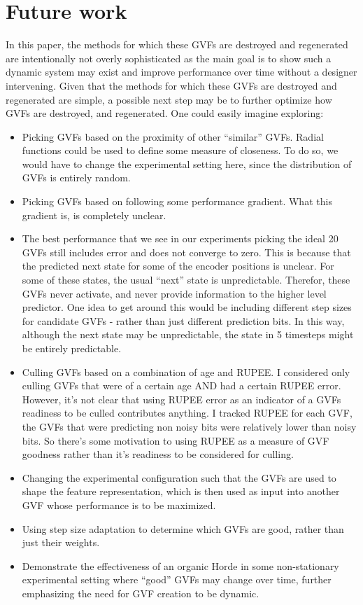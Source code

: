 \documentclass[letterpaper]{article}
\begin{document}
\section{Future work}
In this paper, the methods for which these GVFs are destroyed and regenerated are intentionally not overly sophisticated as the main goal is to show such a dynamic system may exist and improve performance over time without a designer intervening. Given that the methods for which these GVFs are destroyed and regenerated are simple, a possible next step may be to further optimize how GVFs are destroyed, and regenerated. One could easily imagine exploring:
\begin{itemize}
  \item Picking GVFs based on the proximity of other ``similar'' GVFs. Radial functions could be used to define some measure of closeness. To do so, we would have to change the experimental setting here, since the distribution of GVFs is entirely random. 
  \item Picking GVFs based on following some performance gradient. What this gradient is, is completely unclear.  
  \item The best performance that we see in our experiments picking the ideal 20 GVFs still includes error and does not converge to zero. This is because that the predicted next state for some of the encoder positions is unclear. For some of these states, the usual ``next'' state is unpredictable. Therefor, these GVFs never activate, and never provide information to the higher level predictor. One idea to get around this would be including different step sizes for candidate GVFs - rather than just different prediction bits. In this way, although the next state may be unpredictable, the state in 5 timesteps might be entirely predictable. 
  \item Culling GVFs based on a combination of age and RUPEE. I considered only culling GVFs that were of a certain age AND had a certain RUPEE error. However, it's not clear that using RUPEE error as an indicator of a GVFs readiness to be culled contributes anything. I tracked RUPEE for each GVF, the GVFs that were predicting non noisy bits were relatively lower than noisy bits. So there's some motivation to using RUPEE as a measure of GVF goodness rather than it's readiness to be considered for culling.
  \item Changing the experimental configuration such that the GVFs are used to shape the feature representation, which is then used as input into another GVF whose performance is to be maximized.
  \item Using step size adaptation to determine which GVFs are good, rather than just their weights.
  \item Demonstrate the effectiveness of an organic Horde in some non-stationary experimental setting where ``good'' GVFs may change over time, further emphasizing the need for GVF creation to be \cite{White:2015} dynamic.
\end{itemize}


\end{document}
